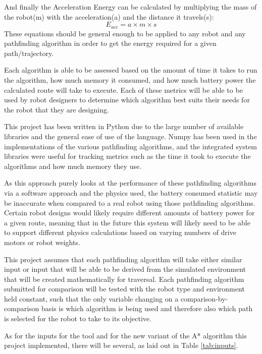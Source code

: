 And finally the Acceleration Energy can be calculated by multiplying the mass of the robot(m) with the acceleration(a) and the distance it travels(s):\begin{equation}
    E_{acc} = a \times m \times s
\end{equation}
These equations\cite{henkel2016energy} should be general enough to be applied to any robot and any pathfinding algorithm in order to get the energy required for a given path/trajectory.
\par
Each algorithm is able to be assessed based on the amount of time it takes to run the algorithm, how much memory it consumed, and how much battery power the calculated route will take to execute. Each of these metrics will be able to be used by robot designers to determine which algorithm best suits their needs for the robot that they are designing.
\par
This project has been written in Python due to the large number of available libraries and the general ease of use of the language. Numpy \cite{numpy_2021} has been used in the implementations of the various pathfinding algorithms, and the integrated system libraries were useful for tracking metrics such as the time it took to execute the algorithms and how much memory they use.
\par
As this approach purely looks at the performance of these pathfinding algorithms via a software approach and the physics used, the battery consumed statistic may be inaccurate when compared to a real robot using those pathfinding algorithms. Certain robot designs would likely require different amounts of battery power for a given route, meaning that in the future this system will likely need to be able to support different physics calculations based on varying numbers of drive motors or robot weights.
\par
This project assumes that each pathfinding algorithm will take either similar input or input that will be able to be derived from the simulated environment that will be created mathematically for traversal. Each pathfinding algorithm submitted for comparison will be tested with the robot type and environment held constant, such that the only variable changing on a comparison-by-comparison basis is which algorithm is being used and therefore also which path is selected for the robot to take to its objective.
\par
As for the inputs for the tool and for the new variant of the A* algorithm this project implemented, there will be several, as laid out in Table \ref{tab:inputs}.

